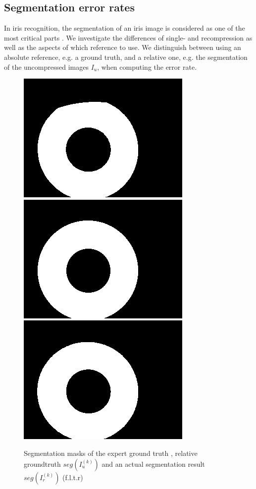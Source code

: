 \documentclass[10pt,twocolumn,letterpaper]{article}
\begin{document}
\subsection{Segmentation error rates}
\label{section:ser}
In iris recognition, the segmentation of an iris image is considered as one of the most critical parts \cite{BDaugman08a, severeCompression}. %
We investigate the differences of single- and recompression as well as the aspects of which reference to use. We distinguish between using an absolute reference, e.g. a ground truth, and a relative one, e.g. the segmentation of the uncompressed images $I_u$, when computing the error rate.

\begin{figure}
\begin{center}

  \includegraphics[width=0.3\linewidth]{img/segMasks/gt.png}
  \includegraphics[width=0.3\linewidth]{img/segMasks/jpg_caht_q100_cr5.png}
  \includegraphics[width=0.3\linewidth]{img/segMasks/jpg_wahet_q100_cr5.png}
  \end{center}
  
  \label{fig:segMasks}
  \caption{Segmentation masks of the expert ground truth \cite{Hofbauer14b}, relative groundtruth $seg(I_u^{(k)})$ and an actual segmentation result $seg(I_r^{(k)})$ (f.l.t.r)}
\end{figure}

\end{document}
